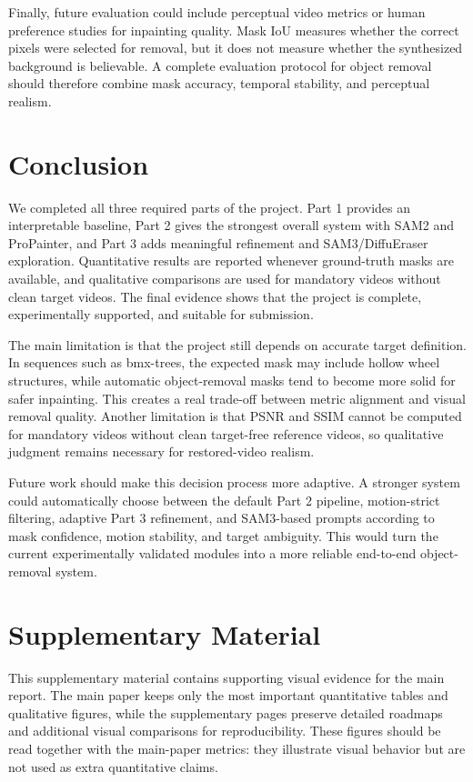 \documentclass[10pt,twocolumn,letterpaper]{article}
\begin{document}
Finally, future evaluation could include perceptual video metrics or human preference studies for inpainting quality. Mask IoU measures whether the correct pixels were selected for removal, but it does not measure whether the synthesized background is believable. A complete evaluation protocol for object removal should therefore combine mask accuracy, temporal stability, and perceptual realism.

\section{Conclusion}
We completed all three required parts of the project. Part 1 provides an interpretable baseline, Part 2 gives the strongest overall system with SAM2 and ProPainter, and Part 3 adds meaningful refinement and SAM3/DiffuEraser exploration. Quantitative results are reported whenever ground-truth masks are available, and qualitative comparisons are used for mandatory videos without clean target videos. The final evidence shows that the project is complete, experimentally supported, and suitable for submission.

The main limitation is that the project still depends on accurate target definition. In sequences such as bmx-trees, the expected mask may include hollow wheel structures, while automatic object-removal masks tend to become more solid for safer inpainting. This creates a real trade-off between metric alignment and visual removal quality. Another limitation is that PSNR and SSIM cannot be computed for mandatory videos without clean target-free reference videos, so qualitative judgment remains necessary for restored-video realism.

Future work should make this decision process more adaptive. A stronger system could automatically choose between the default Part 2 pipeline, motion-strict filtering, adaptive Part 3 refinement, and SAM3-based prompts according to mask confidence, motion stability, and target ambiguity. This would turn the current experimentally validated modules into a more reliable end-to-end object-removal system.

\FloatBarrier
{\small
    
    
}

\onecolumn
\appendix
\section{Supplementary Material}
This supplementary material contains supporting visual evidence for the main report. The main paper keeps only the most important quantitative tables and qualitative figures, while the supplementary pages preserve detailed roadmaps and additional visual comparisons for reproducibility. These figures should be read together with the main-paper metrics: they illustrate visual behavior but are not used as extra quantitative claims.
\end{document}
